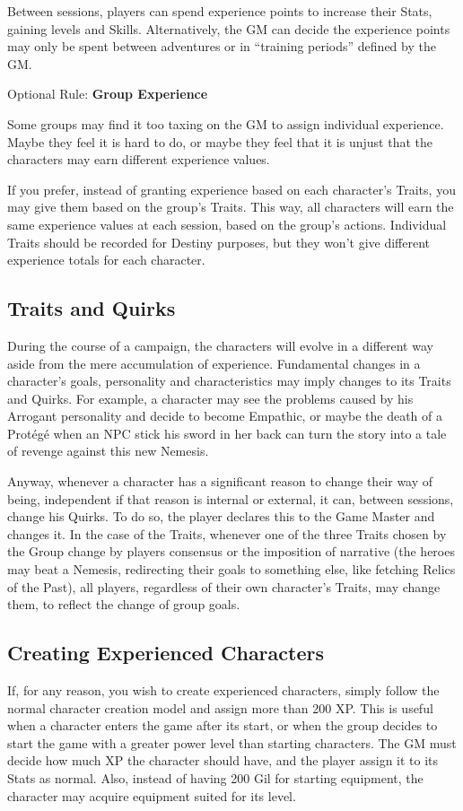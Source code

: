 \begin{multicols}{2}
Between sessions, players can spend experience points to increase their Stats, gaining levels and Skills. Alternatively, the GM can decide the experience points may only be spent  between adventures or  in “training periods” defined by the GM\@. 

\begin{boco}
Optional Rule: \textbf{Group Experience}\pc%

Some groups may find it too taxing on the GM to assign individual experience. Maybe they feel it is hard to do, or maybe they feel that it is unjust that the characters may earn different experience values.

If you prefer, instead of granting experience based on each character's Traits, you may give them based on the group's Traits. This way, all characters will earn the same experience values at each session, based on the group's actions. Individual Traits should be recorded for Destiny purposes, but they won't give different experience totals for each character.
\end{boco}

\subsection{Traits and Quirks}\label{subsec:gm-traits}
During the course of a campaign, the characters will evolve in a different way aside from the mere accumulation of experience. Fundamental changes in a character’s goals, personality and characteristics may imply changes to its Traits and Quirks. For example, a character may see the problems caused by his Arrogant personality and decide to become Empathic, or maybe the death of a Protégé when an NPC stick his sword in her back can turn the story into a tale of revenge against this new Nemesis.

Anyway, whenever a character has a significant reason to change their way of being, independent if that reason is internal or external, it can, between sessions, change his Quirks. To do so, the player declares this to the Game Master and changes it. In the case of the Traits, whenever one of the three Traits chosen by the Group change by players consensus or the imposition of narrative (the heroes may beat a Nemesis, redirecting their goals to something else, like fetching Relics of the Past), all players, regardless of their own character’s Traits, may change them, to reflect the change of group goals.

\subsection{Creating Experienced Characters}\label{subsec:gm-expchars}
If, for any reason, you wish to create experienced characters, simply follow the normal character creation model and assign more than 200 XP\@. This is useful when a character enters the game after its start, or when the group decides to start the game with a greater power level than starting characters. The GM must decide how much XP the character should have, and the player assign it to its Stats as normal. Also, instead of having 200 Gil for starting equipment, the character may acquire equipment suited for its level.


\end{multicols}
